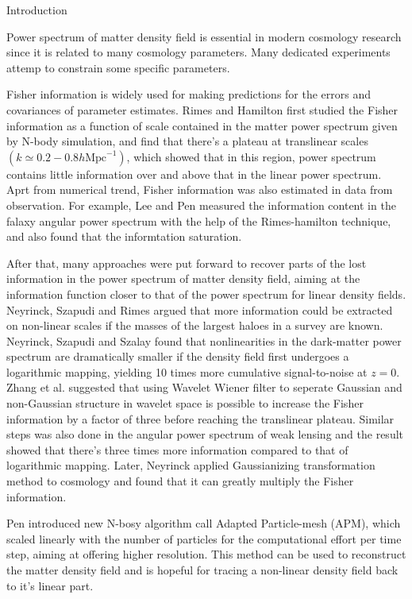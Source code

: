 \begin{section}{Introduction}
  \label{sec:introduction}
  
  Power spectrum of matter density field is essential in modern cosmology research since it is related to many cosmology parameters. Many dedicated experiments attemp to constrain some specific parameters. 

  Fisher information is widely used for making predictions for the errors and covariances of parameter estimates. Rimes and Hamilton\cite{Rimes2006} first studied the Fisher information as a function of scale contained in the matter power spectrum given by N-body simulation, and find that there's a plateau at translinear scales $(k \simeq 0.2-0.8 h\mathrm{Mpc}^{-1})$, which showed that in this region, power spectrum contains little information over and above that in the linear power spectrum. Aprt from numerical trend, Fisher information was also estimated in data from observation. For example, Lee and Pen \cite{bib:Lee2008} measured the information content in the falaxy angular power spectrum with the help of the Rimes-hamilton technique, and also found that the informtation saturation. 
  
  After that, many approaches were put forward to recover parts of the lost information in the power spectrum of matter density field, aiming at the information function closer to that of the power spectrum for linear density fields. Neyrinck, Szapudi and Rimes \cite{bib:Mark2006} argued that more information could be extracted on non-linear scales if the masses of the largest haloes in a survey are known. Neyrinck, Szapudi and Szalay \cite{bib:Mark2009} found that nonlinearities in the dark-matter power spectrum are dramatically smaller if the density field first undergoes a logarithmic mapping, yielding 10 times more cumulative signal-to-noise at $z = 0$. Zhang et al. \cite{bib:Zhang2011} suggested that using Wavelet Wiener filter to seperate Gaussian and non-Gaussian structure in wavelet space is possible to increase the Fisher information by a factor of three before reaching the translinear plateau. Similar steps was also done in the angular power spectrum of weak lensing \cite{bib:Yu2012} and the result showed that there's three times more information compared to that of logarithmic mapping. Later, Neyrinck \cite{bib:Mark2014} applied Gaussianizing transformation method to cosmology and found that it can greatly multiply the Fisher information. 

  Pen \cite{bib:Pen1995}\cite{bib:Pen1998} introduced new N-bosy algorithm call Adapted Particle-mesh (APM), which scaled linearly with the number of particles for the computational effort per time step, aiming at offering higher resolution. This method can be used to reconstruct the matter density field and is hopeful for tracing a non-linear density field back to it's linear part\cite{bib:Zhu2016}.


\end{section}
